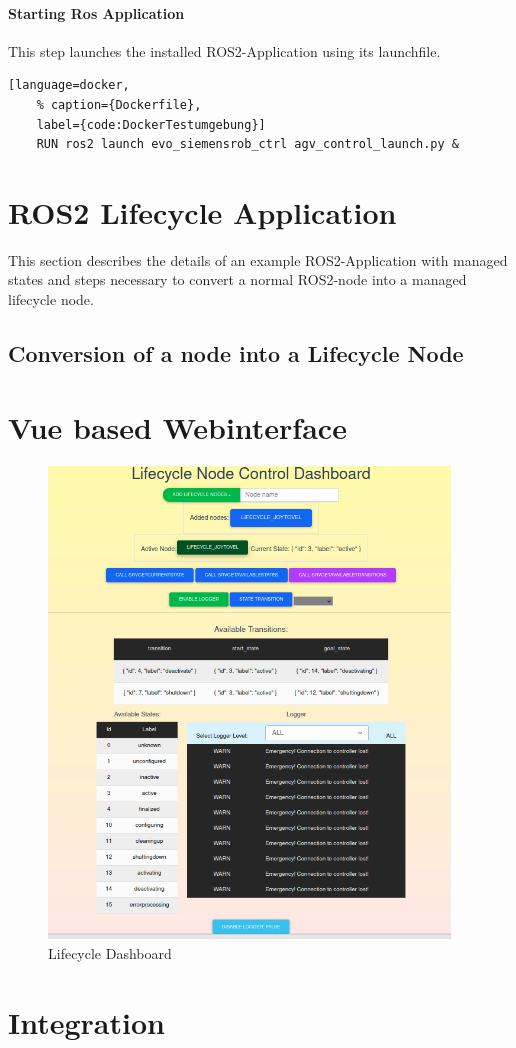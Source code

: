 \paragraph{Starting Ros Application} This step launches the installed ROS2-Application using its launchfile.
\begin{lstlisting}[language=docker,
	% caption={Dockerfile}, 
	label={code:DockerTestumgebung}]
	RUN ros2 launch evo_siemensrob_ctrl agv_control_launch.py &
\end{lstlisting}



\section{ROS2 Lifecycle Application}
\label{Implementierung:ROS2LifecycleApplication} This section describes the details of an example ROS2-Application with managed states and steps necessary to convert a normal ROS2-node into a managed lifecycle node.     

\subsection{Conversion of a node into a Lifecycle Node}

\section{Vue based Webinterface}
\label{Implementierung:VueBasedWebinterface}

\begin{figure}[H]
	\centering
	\includegraphics[width=0.95\textwidth]{"Bilder/lifecycle-dashboard.png"}
	\caption{Lifecycle Dashboard}
	\label{fig:Background:LifecycleDashboard}					
\end{figure}

\section{Integration}
\label{Implementierung:Integration}


	
		
		
	
	